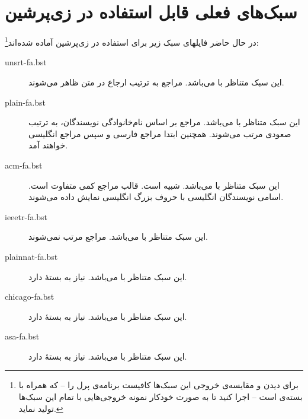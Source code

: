 \documentclass{article}
\theoremstyle{plain}\newtheorem{question}{پرسش}
\begin{document}
\section{سبک‌های فعلی قابل استفاده در زی‌پرشین}
در حال حاضر فایلهای سبک زیر برای استفاده در زی‌پرشین آماده شده‌اند\footnote{برای دیدن و مقایسه‌ی خروجی این سبک‌ها کافیست برنامه‌ی پرل  را -- که همراه با بسته‌ی  است -- اجرا کنید تا به صورت خودکار نمونه خروجی‌هایی با تمام این سبک‌ها تولید نماید.}:
\begin{description}
\item [unsrt-fa.bst] این سبک متناظر با  می‌باشد. مراجع به ترتیب ارجاع در متن ظاهر می‌شوند.
\item [plain-fa.bst] این سبک متناظر با  می‌باشد. مراجع بر اساس نام‌خانوادگی نویسندگان، به ترتیب صعودی مرتب می‌شوند.
 همچنین ابتدا مراجع فارسی و سپس مراجع انگلیسی خواهند آمد.
\item [acm-fa.bst] این سبک متناظر با  می‌باشد. شبیه  است.  قالب مراجع کمی متفاوت است. اسامی نویسندگان انگلیسی با حروف بزرگ انگلیسی نمایش داده می‌شوند.
\item [ieeetr-fa.bst] این سبک متناظر با  می‌باشد. مراجع مرتب نمی‌شوند.
\item [plainnat-fa.bst] این سبک متناظر با  می‌باشد. نیاز به بستهٔ  دارد.
\item [chicago-fa.bst] این سبک متناظر با  می‌باشد. نیاز به بستهٔ  دارد.
\item [asa-fa.bst] این سبک متناظر با  می‌باشد. نیاز به بستهٔ  دارد.
\end{description}
\end{document}
